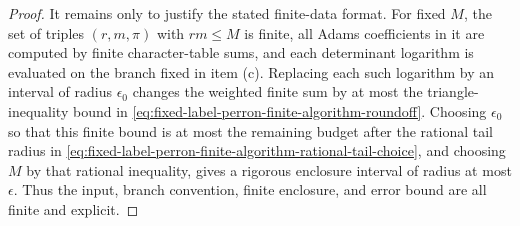 \begin{proof}
  It remains only to justify the stated finite-data format.  For fixed
  \(M\), the set of triples \((r,m,\pi)\) with \(rm\le M\) is finite, all
  Adams coefficients in it are computed by finite character-table sums, and
  each determinant logarithm is evaluated on the branch fixed in item (c).
  Replacing each such logarithm by an interval of radius \(\epsilon_0\) changes
  the weighted finite sum by at most the triangle-inequality bound in
  \eqref{eq:fixed-label-perron-finite-algorithm-roundoff}.  Choosing
  \(\epsilon_0\) so that this finite bound is at most the remaining budget
  after the rational tail radius in
  \eqref{eq:fixed-label-perron-finite-algorithm-rational-tail-choice}, and
  choosing \(M\) by that rational inequality, gives a rigorous enclosure interval
  of radius at most \(\epsilon\).  Thus the input, branch convention, finite
  enclosure, and error bound are all finite and explicit.
\end{proof}

